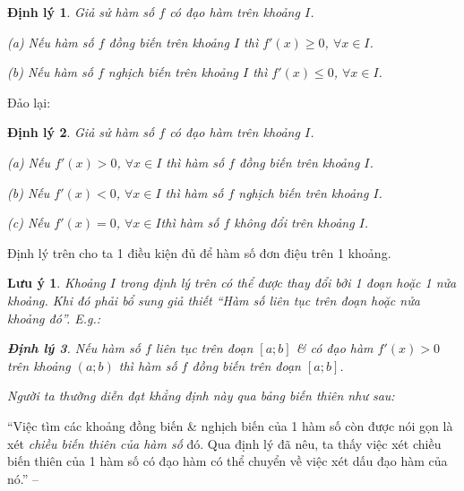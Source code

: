 \documentclass{article}
\numberwithin{equation}{section}
\newtheorem{luuy}{Lưu ý}[section]
\newtheorem{dinhly}{Định lý}[section]
\begin{document}
\begin{dinhly}
	Giả sử hàm số $f$ có đạo hàm trên khoảng $I$.
	\begin{enumerate*}
		\item[(a)] Nếu hàm số $f$ đồng biến trên khoảng $I$ thì $f'(x)\ge 0$, $\forall x\in I$.
		\item[(b)] Nếu hàm số $f$ nghịch biến trên khoảng $I$ thì $f'(x)\le 0$, $\forall x\in I$.
	\end{enumerate*}
\end{dinhly}
Đảo lại:

\begin{dinhly}
	\label{thm:dau dao ham & tinh dong bien}
	Giả sử hàm số $f$ có đạo hàm trên khoảng $I$.
	\begin{enumerate*}
		\item[(a)] Nếu $f'(x) > 0$, $\forall x\in I$ thì hàm số $f$ đồng biến trên khoảng $I$.
		\item[(b)] Nếu $f'(x) < 0$, $\forall x\in I$ thì hàm số $f$ nghịch biến trên khoảng $I$.
		\item[(c)] Nếu $f'(x) = 0$, $\forall x\in I$thì hàm số $f$ không đổi trên khoảng $I$.
	\end{enumerate*}
\end{dinhly}
Định lý trên cho ta 1 điều kiện đủ để hàm số đơn điệu trên 1 khoảng.

\begin{luuy}
	Khoảng $I$ trong định lý trên có thể được thay đổi bởi 1 đoạn hoặc 1 nửa khoảng. Khi đó phải bổ sung giả thiết ``Hàm số liên tục trên đoạn hoặc nửa khoảng đó''. E.g.:
	
	\begin{dinhly}
		Nếu hàm số $f$ liên tục trên đoạn $[a;b]$ \& có đạo hàm $f'(x) > 0$ trên khoảng $(a;b)$ thì hàm số $f$ đồng biến trên đoạn $[a;b]$.
	\end{dinhly}
	Người ta thường diễn đạt khẳng định này qua bảng biến thiên như sau:
	
	\begin{center}
	\end{center}
\end{luuy}
``Việc tìm các khoảng đồng biến \& nghịch biến của 1 hàm số còn được nói gọn là xét \textit{chiều biến thiên của hàm số} đó. Qua định lý đã nêu, ta thấy việc xét chiều biến thiên của 1 hàm số có đạo hàm có thể chuyển về việc xét dấu đạo hàm của nó.'' -- \cite[p. 5]{SGK_Toan_12_giai_tich_nang_cao}
\end{document}
